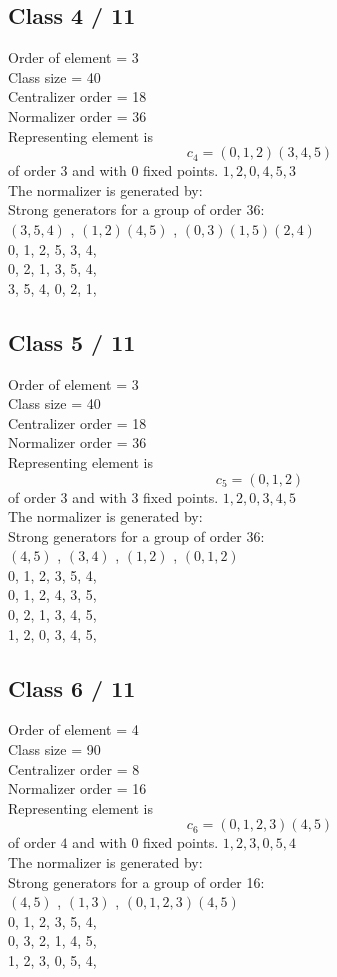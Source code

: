 \subsection*{Class 4 / 11}
Order of element = 3\\
Class size = 40\\
Centralizer order = 18\\
Normalizer order = 36\\
Representing element is
$$c_{4} = 
(0, 1, 2)(3, 4, 5)$$
of order $3$ and with 0 fixed points.
$1,2,0,4,5,3$\\
The normalizer is generated by:\\
Strong generators for a group of order 36:\\
$
(3, 5, 4)$
, 
$
(1, 2)(4, 5)$
, 
$
(0, 3)(1, 5)(2, 4)$
\\
0, 1, 2, 5, 3, 4, \\
0, 2, 1, 3, 5, 4, \\
3, 5, 4, 0, 2, 1, \\
\bigskip
\subsection*{Class 5 / 11}
Order of element = 3\\
Class size = 40\\
Centralizer order = 18\\
Normalizer order = 36\\
Representing element is
$$c_{5} = 
(0, 1, 2)$$
of order $3$ and with 3 fixed points.
$1,2,0,3,4,5$\\
The normalizer is generated by:\\
Strong generators for a group of order 36:\\
$
(4, 5)$
, 
$
(3, 4)$
, 
$
(1, 2)$
, 
$
(0, 1, 2)$
\\
0, 1, 2, 3, 5, 4, \\
0, 1, 2, 4, 3, 5, \\
0, 2, 1, 3, 4, 5, \\
1, 2, 0, 3, 4, 5, \\
\bigskip
\subsection*{Class 6 / 11}
Order of element = 4\\
Class size = 90\\
Centralizer order = 8\\
Normalizer order = 16\\
Representing element is
$$c_{6} = 
(0, 1, 2, 3)(4, 5)$$
of order $4$ and with 0 fixed points.
$1,2,3,0,5,4$\\
The normalizer is generated by:\\
Strong generators for a group of order 16:\\
$
(4, 5)$
, 
$
(1, 3)$
, 
$
(0, 1, 2, 3)(4, 5)$
\\
0, 1, 2, 3, 5, 4, \\
0, 3, 2, 1, 4, 5, \\
1, 2, 3, 0, 5, 4, \\
\bigskip
